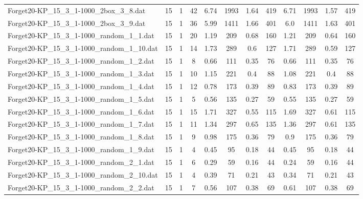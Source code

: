 \begin{sidewaystable}[!ht]
{\begin{tabular}{lccccccccccc}
Forget20-KP\_15\_3\_1-1000\_2box\_3\_8.dat & 15 & 1 & 42 & 6.74 & 1993 & 1.64 & 419 & 6.71 & 1993 &  \textcolor{blue2}{1.57} & 419 \\
Forget20-KP\_15\_3\_1-1000\_2box\_3\_9.dat & 15 & 1 & 36 & 5.99 & 1411 & 1.66 & 401 & 6.0 & 1411 &  \textcolor{blue2}{1.63} & 401 \\
Forget20-KP\_15\_3\_1-1000\_random\_1\_1.dat & 15 & 1 & 20 & 1.19 & 209 & 0.68 & 160 & 1.21 & 209 &  \textcolor{blue2}{0.64} & 160 \\
Forget20-KP\_15\_3\_1-1000\_random\_1\_10.dat & 15 & 1 & 14 & 1.73 & 289 & 0.6 & 127 & 1.71 & 289 &  \textcolor{blue2}{0.59} & 127 \\
Forget20-KP\_15\_3\_1-1000\_random\_1\_2.dat & 15 & 1 & 8 & 0.66 & 111 &  \textcolor{blue2}{0.35} & 76 & 0.66 & 111 &  \textcolor{blue2}{0.35} & 76 \\
Forget20-KP\_15\_3\_1-1000\_random\_1\_3.dat & 15 & 1 & 10 & 1.15 & 221 &  \textcolor{blue2}{0.4} & 88 & 1.08 & 221 &  \textcolor{blue2}{0.4} & 88 \\
Forget20-KP\_15\_3\_1-1000\_random\_1\_4.dat & 15 & 1 & 12 & 0.78 & 173 &  \textcolor{blue2}{0.39} & 89 & 0.83 & 173 &  \textcolor{blue2}{0.39} & 89 \\
Forget20-KP\_15\_3\_1-1000\_random\_1\_5.dat & 15 & 1 & 5 & 0.56 & 135 &  \textcolor{blue2}{0.27} & 59 & 0.55 & 135 &  \textcolor{blue2}{0.27} & 59 \\
Forget20-KP\_15\_3\_1-1000\_random\_1\_6.dat & 15 & 1 & 15 & 1.71 & 327 &  \textcolor{blue2}{0.55} & 115 & 1.69 & 327 & 0.61 & 115 \\
Forget20-KP\_15\_3\_1-1000\_random\_1\_7.dat & 15 & 1 & 11 & 1.34 & 297 & 0.65 & 135 & 1.36 & 297 &  \textcolor{blue2}{0.61} & 135 \\
Forget20-KP\_15\_3\_1-1000\_random\_1\_8.dat & 15 & 1 & 9 & 0.98 & 175 &  \textcolor{blue2}{0.36} & 79 & 0.9 & 175 &  \textcolor{blue2}{0.36} & 79 \\
Forget20-KP\_15\_3\_1-1000\_random\_1\_9.dat & 15 & 1 & 4 & 0.45 & 95 &  \textcolor{blue2}{0.18} & 44 & 0.45 & 95 &  \textcolor{blue2}{0.18} & 44 \\
Forget20-KP\_15\_3\_1-1000\_random\_2\_1.dat & 15 & 1 & 6 & 0.29 & 59 &  \textcolor{blue2}{0.16} & 44 & 0.24 & 59 &  \textcolor{blue2}{0.16} & 44 \\
Forget20-KP\_15\_3\_1-1000\_random\_2\_10.dat & 15 & 1 & 4 & 0.39 & 71 &  \textcolor{blue2}{0.21} & 43 & 0.34 & 71 &  \textcolor{blue2}{0.21} & 43 \\
Forget20-KP\_15\_3\_1-1000\_random\_2\_2.dat & 15 & 1 & 7 & 0.56 & 107 &  \textcolor{blue2}{0.38} & 69 & 0.61 & 107 &  \textcolor{blue2}{0.38} & 69 \\

\end{tabular}}
\end{sidewaystable}
